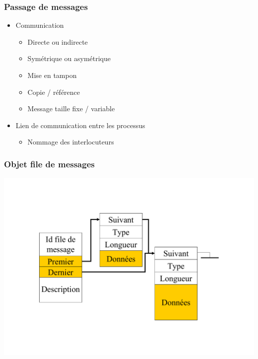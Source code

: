 \begin{frame}
\frametitle{Passage de messages}
\begin{itemize}
\item Communication
\begin{itemize}
\item Directe ou indirecte
\item Symétrique ou asymétrique
\item Mise en tampon
\item Copie / référence
\item Message taille fixe / variable
\end{itemize}
\item Lien de communication entre les processus
\begin{itemize}
\item Nommage des interlocuteurs
\end{itemize}
\end{itemize}
\end{frame}

\begin{frame}
\frametitle{Objet file de messages}
\includegraphics[width=.9\textwidth]{../illustration/file_messages.pdf}
\end{frame}

